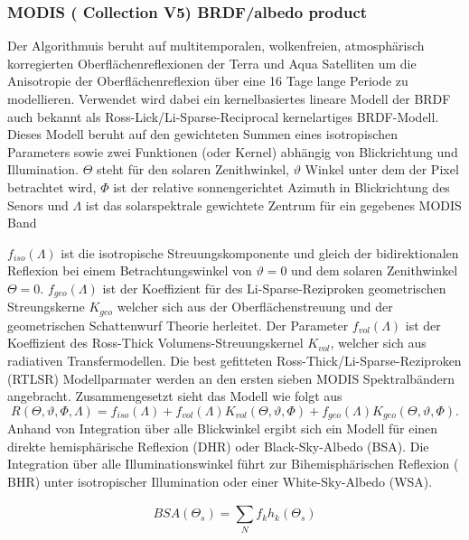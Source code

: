 \documentclass[11pt]{report}
\begin{document}
\subsubsection{MODIS ( Collection V5) BRDF/albedo product}
Der Algorithmuis beruht auf multitemporalen, wolkenfreien, atmosphärisch korregierten Oberflächenreflexionen der Terra und Aqua Satelliten um die Anisotropie der Oberflächenreflexion über eine 16 Tage lange Periode zu modellieren.
Verwendet wird dabei ein kernelbasiertes lineare Modell der BRDF auch bekannt als Ross-Lick/Li-Sparse-Reciprocal kernelartiges BRDF-Modell. Dieses Modell beruht auf den gewichteten Summen eines isotropischen Parameters sowie zwei Funktionen (oder Kernel) abhängig von Blickrichtung und Illumination. $\Theta$ steht für den solaren Zenithwinkel, $\vartheta$ Winkel unter dem der Pixel betrachtet wird, $\Phi$ ist der relative sonnengerichtet Azimuth in Blickrichtung des Senors und $\Lambda$ ist das solarspektrale gewichtete Zentrum für ein gegebenes MODIS Band

$f_{iso}(\Lambda)$ ist die isotropische Streuungskomponente und gleich der bidirektionalen Reflexion bei einem Betrachtungswinkel von $\vartheta=0$ und dem solaren Zenithwinkel $\Theta=0$. $f_{geo}(\Lambda)$ ist der Koeffizient für des Li-Sparse-Reziproken geometrischen Streungskerne $K_{geo}$ welcher sich aus der Oberflächenstreuung und der geometrischen Schattenwurf Theorie herleitet. Der Parameter $f_{vol}(\Lambda)$ ist der Koeffizient des Ross-Thick Volumens-Streuungskernel $K_{vol}$, welcher sich aus radiativen Transfermodellen. Die best gefitteten Ross-Thick/Li-Sparse-Reziproken (RTLSR) Modellparmater werden an den ersten sieben MODIS Spektralbändern angebracht. Zusammengesetzt sieht das Modell wie folgt aus
\begin{equation}
R(\Theta,\vartheta,\Phi,\Lambda) = f_{iso}(\Lambda) + f_{vol}(\Lambda)K_{vol}(\Theta,\vartheta,\Phi) + f_{geo}(\Lambda)K_{geo}(\Theta,\vartheta,\Phi).
\end{equation}
Anhand von Integration über alle Blickwinkel ergibt sich ein Modell für einen direkte hemisphärische Reflexion (DHR) oder Black-Sky-Albedo (BSA). Die Integration über alle Illuminationswinkel führt zur Bihemisphärischen Reflexion ( BHR) unter isotropischer Illumination oder einer White-Sky-Albedo (WSA).\newline

\begin{equation}
BSA(\Theta_s)=\sum_{N}^{}f_kh_k(\Theta_s)
\end{equation}
\end{document}
